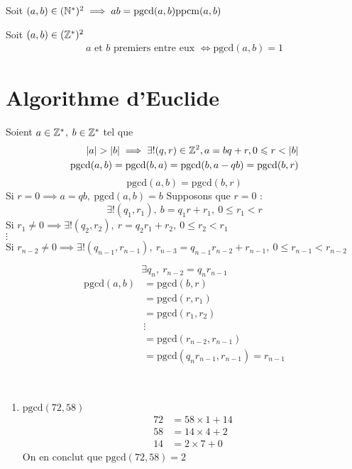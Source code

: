 \begin{theoreme}
Soit $(a, b) \in (\mathbb{N}^*)^2 \implies ab = \mathrm{pgcd}(a, b)\mathrm{ppcm}(a, b)$
\end{theoreme}

\begin{definition}
	Soit $(a, b) \in (\mathbb{Z}^*)^2$
	\begin{align*}
	a \text{ et } b \text{ premiers entre eux } \iff \mathrm{pgcd}(a, b) = 1
	\end{align*}
\end{definition}

\section{Algorithme d'Euclide}
\begin{proposition}
Soient $a \in \mathbb{Z}^*$, $b \in \mathbb{Z}^*$ tel que 
\begin{align*}
|a| > |b| \implies \exists ! (q, r) \in \mathbb{Z}^2, a = b q + r, 0 \leqslant r < |b| \\
\mathrm{pgcd}(a, b) = \mathrm{pgcd}(b, a) = \mathrm{pgcd}(b, a - qb) = \mathrm{pgcd}(b, r) \\
\end{align*}
\begin{equation*}
\mathrm{pgcd}(a, b) = \mathrm{pgcd}(b, r)
\end{equation*}
Si $r = 0 \implies a = q b,\ \mathrm{pgcd}(a, b) = b$ 
Supposons que $r = 0$ :
\begin{equation*}
\exists ! (q_1, r_1),\ b = q_1 r + r_1, \ 0 \leq r_1 < r
\end{equation*}
Si $r_1 \neq 0 \implies \exists ! (q_2, r_2),\ r = q_2 r_1 + r_2,\ 0 \leq r_2 < r_1$ \\
$\vdots$ \\
Si $r_{n - 2} \neq 0 \implies \exists ! (q_{n - 1}, r_{n - 1}),\ r_{n - 3} = q_{n-1}r_{n-2} + r_{n - 1},\ 0 \leq r_{n-1} < r_{n-2}$

\begin{equation*}
\exists q_n,\ r_{n-2} = q_n r_{n-1}
\end{equation*}
\begin{align*}
\mathrm{pgcd}(a, b) &= \mathrm{pgcd}(b, r) \\
				   &= \mathrm{pgcd}(r, r_1) \\
				   &= \mathrm{pgcd}(r_1, r_2) \\
				   &\vdots \\
				   &= \mathrm{pgcd}(r_{n-2}, r_{n-1}) \\
				   &= \mathrm{pgcd}(q_n r_{n-1}, r_{n-1}) = r_{n-1}
\end{align*}
\end{proposition}

\begin{exemple}~ 
\begin{enumerate}
\item $\mathrm{pgcd}(72, 58)$
\begin{align*}
72 &= 58 \times 1 + 14 \\
58 &= 14 \times 4 + 2 \\
14 &= 2 \times 7 + 0
\end{align*}
On en conclut que $\mathrm{pgcd}(72, 58) = 2$
\end{enumerate}
\end{exemple}